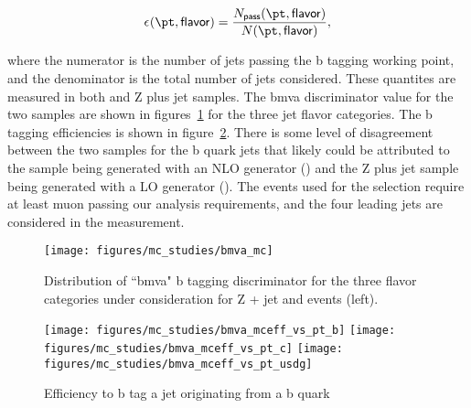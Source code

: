 \begin{equation}
    \epsilon_{}(\pt, \mathsf{flavor}) = \frac{N_{\sf pass}(\pt, \sf
    flavor)}{N(\pt, \sf flavor)},
\end{equation}

where the numerator is the number of jets passing the b tagging working
point, and the denominator is the total number of jets considered.
These quantites are measured in both \ttbar and Z plus jet samples.  The
bmva discriminator value for the two samples are shown in
figures~\ref{fig:btag_bmva} for the three jet flavor categories.  The b
tagging efficiencies is shown in figure~\ref{fig:btag_eff}.  There is
some level of disagreement between the two samples for the b quark jets
that likely could be attributed to the \ttbar sample being generated
with an NLO generator (\POWHEG) and the Z plus jet sample being
generated with a LO generator (\MADGRAPH).  The events used for the
selection require at least muon passing our analysis requirements, and
the four leading \pt jets are considered in the measurement.  

\begin{figure}[h!]
    \centering
    \texttt{[image: figures/mc\_studies/bmva\_mc]}
    \caption{Distribution of ``bmva" b tagging discriminator for the
    three flavor categories under consideration for Z + jet and
    \ttbar events (left).      
    \label{fig:btag_bmva}}
\end{figure}

\begin{figure}[h!]
    \centering
    \texttt{[image: figures/mc\_studies/bmva\_mceff\_vs\_pt\_b]}
    \texttt{[image: figures/mc\_studies/bmva\_mceff\_vs\_pt\_c]}
    \texttt{[image: figures/mc\_studies/bmva\_mceff\_vs\_pt\_usdg]}
    \caption{Efficiency to b tag a jet originating from a b quark
    \label{fig:btag_eff}
    }
\end{figure}

